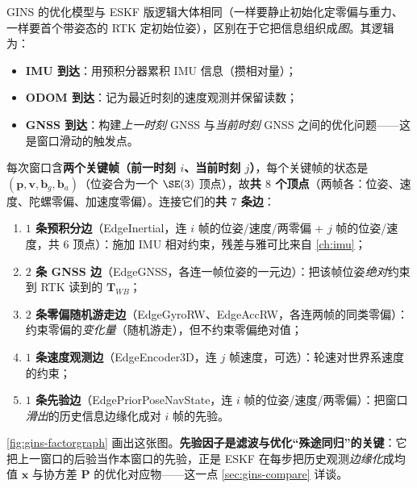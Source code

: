 GINS 的优化模型与 ESKF 版逻辑大体相同（一样要静止初始化定零偏与重力、一样要首个带姿态的 RTK 定初始位姿），区别在于它把信息组织成\emph{图}\cite{gao2023slamad}。其逻辑为：
\begin{itemize}
  \item \textbf{IMU 到达}：用预积分器累积 IMU 信息（攒相对量）；
  \item \textbf{ODOM 到达}：记为最近时刻的速度观测并保留读数；
  \item \textbf{GNSS 到达}：构建\emph{上一时刻} GNSS 与\emph{当前时刻} GNSS 之间的优化问题——这是窗口滑动的触发点。
\end{itemize}
每次窗口含\textbf{两个关键帧（前一时刻 $i$、当前时刻 $j$）}，每个关键帧的状态是 $(\mathbf{p},\mathbf{v},\mathbf{b}_g,\mathbf{b}_a)$（位姿合为一个 $\SE(3)$ 顶点），故\textbf{共 $8$ 个顶点}（两帧各：位姿、速度、陀螺零偏、加速度零偏）。连接它们的\textbf{共 $7$ 条边}\cite{gao2023slamad}：
\begin{enumerate}
  \item \textbf{$1$ 条预积分边}（EdgeInertial，连 $i$ 帧的位姿/速度/两零偏 + $j$ 帧的位姿/速度，共 $6$ 顶点）：施加 IMU 相对约束，残差与雅可比来自 \cref{ch:imu}；
  \item \textbf{$2$ 条 GNSS 边}（EdgeGNSS，各连一帧位姿的一元边）：把该帧位姿\emph{绝对}约束到 RTK 读到的 $\mathbf{T}_{WB}$；
  \item \textbf{$2$ 条零偏随机游走边}（EdgeGyroRW、EdgeAccRW，各连两帧的同类零偏）：约束零偏的\emph{变化量}（随机游走），但不约束零偏绝对值；
  \item \textbf{$1$ 条速度观测边}（EdgeEncoder3D，连 $j$ 帧速度，可选）：轮速对世界系速度的约束；
  \item \textbf{$1$ 条先验边}（EdgePriorPoseNavState，连 $i$ 帧的位姿/速度/两零偏）：把窗口\emph{滑出}的历史信息边缘化成对 $i$ 帧的先验。
\end{enumerate}
\cref{fig:gins-factorgraph} 画出这张图。\textbf{先验因子是滤波与优化“殊途同归”的关键}：它把上一窗口的后验当作本窗口的先验，正是 ESKF 在每步把历史观测\emph{边缘化}成均值 $\mathbf{x}$ 与协方差 $\mathbf{P}$ 的优化对应物——这一点 \cref{sec:gins-compare} 详谈。

